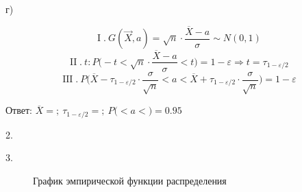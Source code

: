 \documentclass[a4paper,16pt]{article}
\DeclareMathOperator{\I}{I}
\DeclareMathOperator{\II}{II}
\DeclareMathOperator{\III}{III}
\begin{document}
	г)

	\begin{center}
	$$\I. \ G(\overrightarrow{X}, a) = \sqrt{n} \cdot \dfrac{\overline{X} - a}{\sigma} \sim N(0, 1)$$
	$$\II. \ t: P\biggr(-t < \sqrt{n} \cdot \dfrac{\overline{X} - a}{\sigma} < t\biggr) = 1 - \varepsilon \Rightarrow t = \tau_{1-\varepsilon/2}$$
	$$\III. \ P\biggr(\overline{X} -  \tau_{1-\varepsilon/2} \cdot \frac{\sigma}{\sqrt{n}} < a < \overline{X} + \tau_{1-\varepsilon/2} \cdot \frac{\sigma}{\sqrt{n}}\biggr) = 1 - \varepsilon$$
	\end{center}
	Ответ: $\overline{X} = ; \ \tau_{1-\varepsilon/2} = ; \ P\biggr( < a < \biggr) = 0.95$


	2.

	3. 
	\begin{figure}[h]
		\caption{График эмпирической функции распределения}
		\label{fig:image}
	\end{figure}
	
\end{document}
